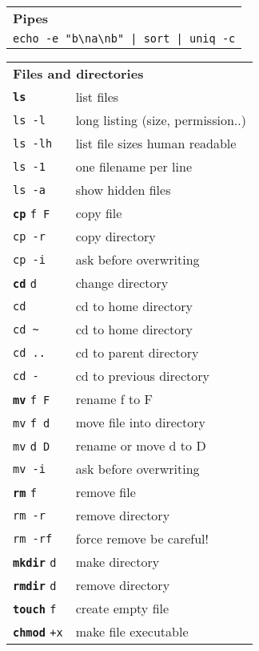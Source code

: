 \documentclass[a4paper,10pt,landscape]{report}
\newcommand{\boxtitle}[1]{{\textbf{\color{RubineRed}#1}}}
\newcommand{\example}[1]{{\texttt{\color{RubineRed}#1}}}
\newcommand{\labbr}[1]{{\texttt{\color{Red}#1}}}
\newcommand{\rabbr}[1]{{\color{Red}#1}}
\newcommand{\co}[1]{\texttt{#1}}
\newcommand{\cob}[1]{\texttt{\textbf{#1}}} %
\begin{document}
\begin{multicols}{4}
\begin{mdframed}[style=mybox2]
\begin{tabular}{ l }
\multicolumn{1}{l}{\boxtitle{Pipes}} \\
\example{echo -e "b\textbackslash{}na\textbackslash{}nb" | sort | uniq -c}
\end{tabular}
\end{mdframed}

\begin{mdframed}[style=mybox]
\begin{tabular}{ l l }
\multicolumn{2}{l}{\boxtitle{Files and directories}} \\
\cob{ls}                   & list files \\
\co{ls -l}                 & long listing (size, permission..) \\
\co{ls -lh}                & list file sizes human readable \\
\co{ls -1}                 & one filename per line \\
\co{ls -a}                 & show hidden files \\
\cob{cp} \labbr{f F}          & copy file \\
\co{cp -r}                 & copy directory \\
\co{cp -i}                 & ask before overwriting \\
\cob{cd} \labbr{d}            & change directory \\
\co{cd}                    & cd to home directory \\
\co{cd \textasciitilde}    & cd to home directory \\
\co{cd ..}                 & cd to parent directory \\
\co{cd -}                  & cd to previous directory \\
\cob{mv} \labbr{f F}          & rename \rabbr{f} to \rabbr{F} \\
\co{mv} \labbr{f d}           & move file into directory \\
\co{mv} {\labbr{d D}}         & rename or move \rabbr{d} to \rabbr{D} \\
\co{mv -i}                 & ask before overwriting \\
\cob{rm} \labbr{f}            & remove file \\
\co{rm -r}                 & remove directory \\
\co{rm -rf}                & force remove \rabbr{be careful$!$} \\
\cob{mkdir} \labbr{d}         & make directory \\
\cob{rmdir} \labbr{d}         & remove directory \\
\cob{touch} \labbr{f}         & create empty file \\
\cob{chmod} \co{+x}        & make file executable \\
\end{tabular}
\end{mdframed}


\end{multicols}
\end{document}
